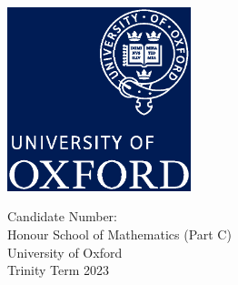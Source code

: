 \documentclass[../dissertation.tex]{subfiles}
\begin{document}
\begin{titlepage}
    \begin{center}
        \vspace*{1cm}

        \Huge
        \textbf{\titlename}

        \vspace{0.5cm}

        \vspace{1.5cm}


        \vfill



        \includegraphics[width=0.4\textwidth]{oxfordlogo}

        \vspace{0.34\textheight}

        \large
        Candidate Number: \candidatenumber \\
        Honour School of Mathematics (Part C) \\
        University of Oxford\\
        Trinity Term 2023

    \end{center}
\end{titlepage}
\end{document}
